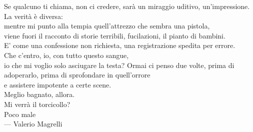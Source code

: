 \begin{flushright}
Se qualcuno ti chiama, non ci credere, sarà un miraggio uditivo, un’impressione. \\
La verità è diversa: \\
mentre mi punto alla tempia quell’attrezzo che sembra una pistola, \\
viene fuori il racconto di storie terribili, fucilazioni, il pianto di bambini. \\
E’ come una confessione non richiesta, una registrazione spedita per errore. \\
Che c’entro, io, con tutto questo sangue, \\
io che mi voglio solo asciugare la testa? Ormai ci penso due volte, prima di adoperarlo, prima di sprofondare in quell’orrore \\
e assistere impotente a certe scene. \\
Meglio bagnato, allora. \\
Mi verrà il torcicollo? \\
Poco male \\ \medskip
--- Valerio Magrelli    
\end{flushright}